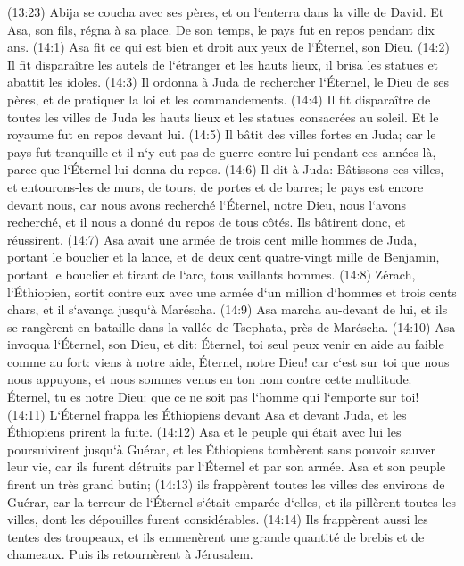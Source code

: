 \verse (13:23) Abija se coucha avec ses pères, et on l`enterra dans la ville de David. Et Asa, son fils, régna à sa place. De son temps, le pays fut en repos pendant dix ans. 
\verse (14:1) Asa fit ce qui est bien et droit aux yeux de l`Éternel, son Dieu. 
\verse (14:2) Il fit disparaître les autels de l`étranger et les hauts lieux, il brisa les statues et abattit les idoles. 
\verse (14:3) Il ordonna à Juda de rechercher l`Éternel, le Dieu de ses pères, et de pratiquer la loi et les commandements. 
\verse (14:4) Il fit disparaître de toutes les villes de Juda les hauts lieux et les statues consacrées au soleil. Et le royaume fut en repos devant lui. 
\verse (14:5) Il bâtit des villes fortes en Juda; car le pays fut tranquille et il n`y eut pas de guerre contre lui pendant ces années-là, parce que l`Éternel lui donna du repos. 
\verse (14:6) Il dit à Juda: Bâtissons ces villes, et entourons-les de murs, de tours, de portes et de barres; le pays est encore devant nous, car nous avons recherché l`Éternel, notre Dieu, nous l`avons recherché, et il nous a donné du repos de tous côtés. Ils bâtirent donc, et réussirent. 
\verse (14:7) Asa avait une armée de trois cent mille hommes de Juda, portant le bouclier et la lance, et de deux cent quatre-vingt mille de Benjamin, portant le bouclier et tirant de l`arc, tous vaillants hommes. 
\verse (14:8) Zérach, l`Éthiopien, sortit contre eux avec une armée d`un million d`hommes et trois cents chars, et il s`avança jusqu`à Maréscha. 
\verse (14:9) Asa marcha au-devant de lui, et ils se rangèrent en bataille dans la vallée de Tsephata, près de Maréscha. 
\verse (14:10) Asa invoqua l`Éternel, son Dieu, et dit: Éternel, toi seul peux venir en aide au faible comme au fort: viens à notre aide, Éternel, notre Dieu! car c`est sur toi que nous nous appuyons, et nous sommes venus en ton nom contre cette multitude. Éternel, tu es notre Dieu: que ce ne soit pas l`homme qui l`emporte sur toi! 
\verse (14:11) L`Éternel frappa les Éthiopiens devant Asa et devant Juda, et les Éthiopiens prirent la fuite. 
\verse (14:12) Asa et le peuple qui était avec lui les poursuivirent jusqu`à Guérar, et les Éthiopiens tombèrent sans pouvoir sauver leur vie, car ils furent détruits par l`Éternel et par son armée. Asa et son peuple firent un très grand butin; 
\verse (14:13) ils frappèrent toutes les villes des environs de Guérar, car la terreur de l`Éternel s`était emparée d`elles, et ils pillèrent toutes les villes, dont les dépouilles furent considérables. 
\verse (14:14) Ils frappèrent aussi les tentes des troupeaux, et ils emmenèrent une grande quantité de brebis et de chameaux. Puis ils retournèrent à Jérusalem. 


